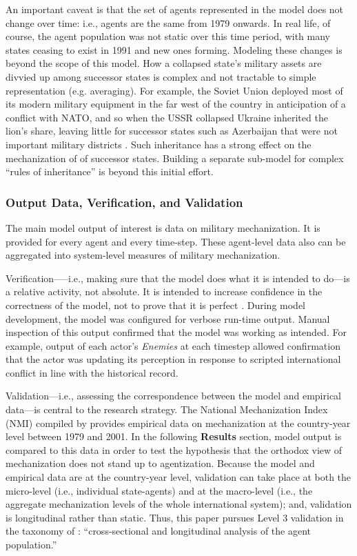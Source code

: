 \documentclass{article}
\begin{document}
An important caveat is that the set of agents represented in the model does not
change over time: i.e., agents are the same from 1979 onwards. In real life,
of course, the agent population was not static over this time period, with many
states ceasing to exist in 1991 and new ones forming. Modeling these changes is
beyond the scope of this model. How a collapsed state's military assets are divvied up
among successor states is complex and not tractable to simple representation
(e.g. averaging). For example, the Soviet Union deployed most of its modern
military equipment in the far west of the country in anticipation of a conflict
with NATO, and so when the USSR collapsed Ukraine inherited the lion's share, leaving
little for successor states such as Azerbaijan that were not important military
districts \citep{roy1993military}. Such inheritance has
a strong effect on the mechanization of of successor states. Building a separate
sub-model for  complex ``rules of inheritance'' is beyond this initial effort.

\subsubsection{Output Data, Verification, and Validation}

The main model output of interest is data on military mechanization. It is provided for
every agent and every time-step. These agent-level data also can be aggregated
into system-level measures of military mechanization. 

Verification--—i.e., making sure that the model does what it is intended to
do---is a relative activity, not absolute. It is intended to increase confidence in the correctness
of the model, not to prove that it is perfect \citep{robinson1997simulation}.
During model development, the model was configured for verbose run-time output. Manual
inspection of this output confirmed that the model was working as intended. For
example, output of each actor's \textit{Enemies} at each timestep allowed
confirmation that the actor was updating its perception in response to scripted
international conflict in line with the historical record.

Validation---i.e., assessing the correspondence between the model and empirical
data---is central to the research strategy. The National Mechanization Index
(NMI) compiled by \citet{sechser2010army} provides empirical data on
mechanization at the country-year level between 1979 and 2001. In the following
\textbf{Results} section, model output is compared to this data in
order to test the hypothesis that the orthodox view of mechanization does
not stand up to agentization. Because the
model and empirical data are at the country-year level, validation can take
place at both the micro-level (i.e., individual state-agents) and at the
macro-level (i.e., the aggregate mechanization levels of the whole international
system); and, validation is longitudinal rather than static. 
Thus, this paper pursues Level 3 validation in the taxonomy of
\citet{axtell1994understanding}: ``cross-sectional and longitudinal analysis of
the agent population.''
\end{document}

